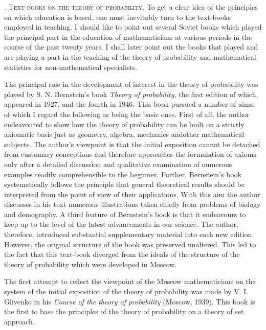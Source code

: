 \bigskip
{}. \textsc{Text-books on the theory of probability.} To get a clear
idea of the principles on which education is based, one must
inevitably turn to the text-books employed in teaching. I should like
to point out several Soviet books which played the principal part in
the education of mathematicians at various periods in the course of
the past twenty years. I shall later point out the books that played
and are playing a part in the teaching of the theory of probability
and mathematical statistics for non-mathematical specialists. 

The principal role in the development of interest in the theory  of
probability was played by S. N. Bernstein's book \textit{Theory of
  probability,} the first edition of which, appeared in 1927, and the
fourth in 1946. This book pursued a number of aims, of which I regard
the following as being the basic ones. First of all, the author
endeavoured to show how the theory of probability can be built on a
strictly axiomatic basis just as geometry, algebra, mechanics
and\pageoriginale other mathematical subjects. The author's viewpoint
is that the initial exposition cannot be detached from customary
conceptions and therefore approaches the formulation of axioms only
after a detailed discussion and qualitative examination of numerous
examples readily comprehensible to the beginner. Further, Bernstein's
book systematically follows the principle that general theoretical
results should be interpreted from the point of view of their
applications. With this aim the author discusses in his text numerous
illustrations taken chiefly from problems of biology and demography. A
third feature of Bernstein's book is that it endeavours to keep up to
the level of the latest advancements in our science. The author,
therefore, introduced substantial supplementary material into each new
edition. However, the original structure of the book was preserved
unaltered. This led to the fact that this text-book diverged from the
ideals of the structure of the theory of probability which were
developed in Moscow.

The first attempt to reflect the viewpoint of the Moscow
mathematicians on the system of the initial exposition of the theory
of probability was made by V. I. Glivenko in his \textit{Course of the
theory of probability} (Moscow, 1939). This book is the first to base
the principles of the theory of probability on a theory of set
approach.

